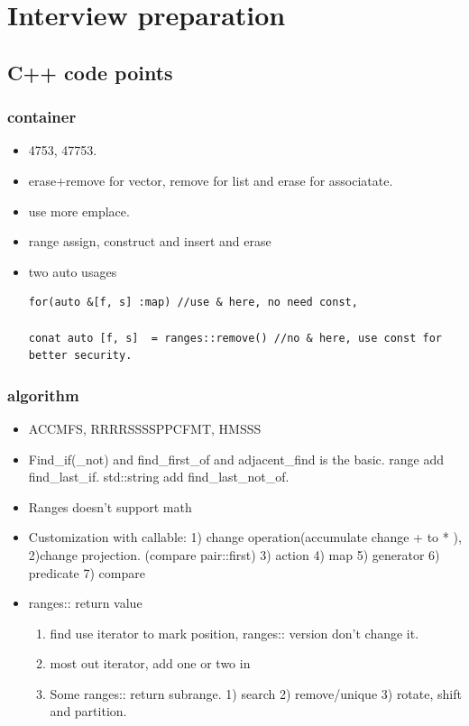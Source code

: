 \documentclass[a4paper,11pt,twoside]{book}
\begin{document}
	  
\chapter{Interview preparation}

\section{C++ code points}
\subsection{container}
\begin{itemize}
	\item 4753, 47753.
	
	\item erase+remove for vector, remove for list and erase for associatate. 
	
	\item use more emplace.
	
	\item range assign, construct and insert and erase
	
	
	\item two auto usages
\begin{lstlisting}
for(auto &[f, s] :map) //use & here, no need const, 

conat auto [f, s]  = ranges::remove() //no & here, use const for better security.
\end{lstlisting}
\end{itemize}
\subsection{algorithm}

\begin{itemize}
	\item ACCMFS, RRRRSSSSPPCFMT, HMSSS
	
	\item Find\_if(\_not) and find\_first\_of and adjacent\_find is the basic. range add find\_last\_if. std::string add find\_last\_not\_of. 
	
	\item Ranges doesn't support math
	
	\item Customization with callable: 1) change operation(accumulate change + to * ), 2)change projection. (compare pair::first)  3) action 4) map 5) generator 6) predicate 7) compare 
	
	\item ranges:: return value
	\begin{enumerate}
		\item find use iterator to mark position, ranges:: version don't change it. 
		
		\item most out iterator, add one or two in
		
		\item Some ranges:: return subrange. 1) search 2) remove/unique 3) rotate, shift and partition. 
	\end{enumerate}
	
\end{itemize}
\end{document}
